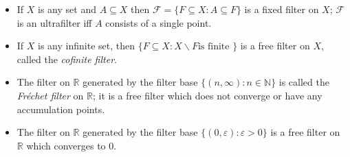 \documentclass[12pt]{article}
\begin{document}
\begin{itemize}
\item
If $X$ is any set and $A\subseteq X$ then $\mathcal{F} = \{ F\subseteq X\colon A\subseteq F\}$ is a fixed filter on $X$; $\mathcal{F}$ is an ultrafilter iff $A$ consists of a single point.
\item
If $X$ is any infinite set, then $\{ F\subseteq X\colon X\smallsetminus F \mbox{is finite }\}$ is a free filter on $X$, called the \emph{cofinite filter}.
\item
The filter on $\mathbb{R}$ generated by the filter base $\{ (n,\infty)\colon n\in\mathbb{N}\}$ is called the \emph{Fr\'echet filter} on $\mathbb{R}$; it is a free filter which does not converge or have any accumulation points.
\item
The filter on $\mathbb{R}$ generated by the filter base $\{ (0,\varepsilon )\colon\varepsilon >0\}$ is a free filter on $\mathbb{R}$ which converges to $0$.
\end{itemize}
\end{document}
